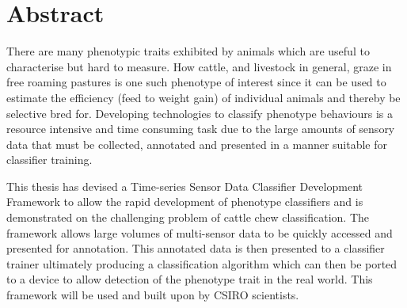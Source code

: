 \chapter{Abstract}

There are many phenotypic traits exhibited by animals which are useful to characterise but hard to measure. How cattle, and livestock in general, graze in free roaming pastures is one such phenotype of interest since it can be used to estimate the efficiency (feed to weight gain) of individual animals and thereby be selective bred for. Developing technologies to classify phenotype behaviours is a resource intensive and time consuming task due to the large amounts of sensory data that must be collected, annotated and presented in a manner suitable for classifier training.

This thesis has devised a Time-series Sensor Data Classifier Development Framework to allow the rapid development of phenotype classifiers and is demonstrated on the challenging problem of cattle chew classification. The framework allows large volumes of multi-sensor data to be quickly accessed and presented for annotation. This annotated data is then presented to a classifier trainer ultimately producing a classification algorithm which can then be ported to a device to allow detection of the phenotype trait in the real world. This framework will be used and built upon by CSIRO scientists.


